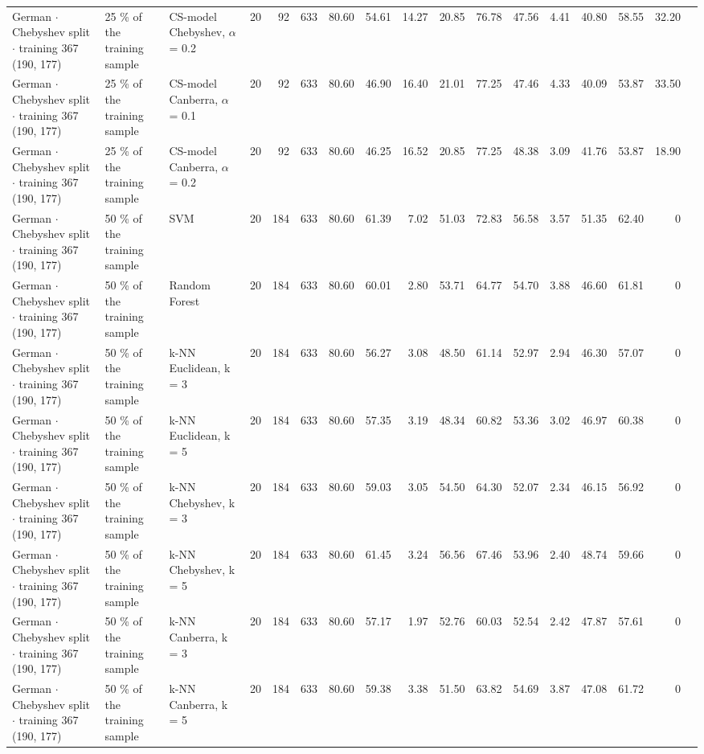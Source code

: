 \begin{longtable}{lllrrrrrrrrrrrrrl}
  German $\cdot$ Chebyshev split $\cdot$ training 367 (190, 177) & 25 \% of the training sample & CS-model Chebyshev, $\alpha$ = 0.2 & 20 & 92 & 633 & 80.60 & 54.61 & 14.27 & 20.85 & 76.78 & 47.56 & 4.41 & 40.80 & 58.55 & 32.20 &  \\
  German $\cdot$ Chebyshev split $\cdot$ training 367 (190, 177) & 25 \% of the training sample & CS-model Canberra, $\alpha$ = 0.1 & 20 & 92 & 633 & 80.60 & 46.90 & 16.40 & 21.01 & 77.25 & 47.46 & 4.33 & 40.09 & 53.87 & 33.50 &  \\
  German $\cdot$ Chebyshev split $\cdot$ training 367 (190, 177) & 25 \% of the training sample & CS-model Canberra, $\alpha$ = 0.2 & 20 & 92 & 633 & 80.60 & 46.25 & 16.52 & 20.85 & 77.25 & 48.38 & 3.09 & 41.76 & 53.87 & 18.90 &  \\
  German $\cdot$ Chebyshev split $\cdot$ training 367 (190, 177) & 50 \% of the training sample & SVM & 20 & 184 & 633 & 80.60 & 61.39 & 7.02 & 51.03 & 72.83 & 56.58 & 3.57 & 51.35 & 62.40 & 0 &  \\
  German $\cdot$ Chebyshev split $\cdot$ training 367 (190, 177) & 50 \% of the training sample & Random Forest & 20 & 184 & 633 & 80.60 & 60.01 & 2.80 & 53.71 & 64.77 & 54.70 & 3.88 & 46.60 & 61.81 & 0 &  \\
  German $\cdot$ Chebyshev split $\cdot$ training 367 (190, 177) & 50 \% of the training sample & k-NN Euclidean, k = 3 & 20 & 184 & 633 & 80.60 & 56.27 & 3.08 & 48.50 & 61.14 & 52.97 & 2.94 & 46.30 & 57.07 & 0 &  \\
  German $\cdot$ Chebyshev split $\cdot$ training 367 (190, 177) & 50 \% of the training sample & k-NN Euclidean, k = 5 & 20 & 184 & 633 & 80.60 & 57.35 & 3.19 & 48.34 & 60.82 & 53.36 & 3.02 & 46.97 & 60.38 & 0 &  \\
  German $\cdot$ Chebyshev split $\cdot$ training 367 (190, 177) & 50 \% of the training sample & k-NN Chebyshev, k = 3 & 20 & 184 & 633 & 80.60 & 59.03 & 3.05 & 54.50 & 64.30 & 52.07 & 2.34 & 46.15 & 56.92 & 0 &  \\
  German $\cdot$ Chebyshev split $\cdot$ training 367 (190, 177) & 50 \% of the training sample & k-NN Chebyshev, k = 5 & 20 & 184 & 633 & 80.60 & 61.45 & 3.24 & 56.56 & 67.46 & 53.96 & 2.40 & 48.74 & 59.66 & 0 &  \\
  German $\cdot$ Chebyshev split $\cdot$ training 367 (190, 177) & 50 \% of the training sample & k-NN Canberra, k = 3 & 20 & 184 & 633 & 80.60 & 57.17 & 1.97 & 52.76 & 60.03 & 52.54 & 2.42 & 47.87 & 57.61 & 0 &  \\
  German $\cdot$ Chebyshev split $\cdot$ training 367 (190, 177) & 50 \% of the training sample & k-NN Canberra, k = 5 & 20 & 184 & 633 & 80.60 & 59.38 & 3.38 & 51.50 & 63.82 & 54.69 & 3.87 & 47.08 & 61.72 & 0 &  \\

\end{longtable}
